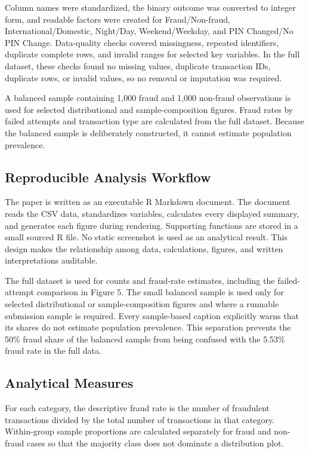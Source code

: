\documentclass[conference,final,]{IEEEtran}
\begin{document}
Column names were standardized, the binary outcome was converted to
integer form, and readable factors were created for Fraud/Non-fraud,
International/Domestic, Night/Day, Weekend/Weekday, and PIN Changed/No
PIN Change. Data-quality checks covered missingness, repeated
identifiers, duplicate complete rows, and invalid ranges for selected
key variables. In the full dataset, these checks found no missing
values, duplicate transaction IDs, duplicate rows, or invalid values, so
no removal or imputation was required.

A balanced sample containing 1,000 fraud and 1,000 non-fraud
observations is used for selected distributional and sample-composition
figures. Fraud rates by failed attempts and transaction type are
calculated from the full dataset. Because the balanced sample is
deliberately constructed, it cannot estimate population prevalence.

\subsection{Reproducible Analysis
Workflow}\label{reproducible-analysis-workflow}

The paper is written as an executable R Markdown document. The document
reads the CSV data, standardizes variables, calculates every displayed
summary, and generates each figure during rendering. Supporting
functions are stored in a small sourced R file. No static screenshot is
used as an analytical result. This design makes the relationship among
data, calculations, figures, and written interpretations auditable.

The full dataset is used for counts and fraud-rate estimates, including
the failed-attempt comparison in Figure 5. The small balanced sample is
used only for selected distributional or sample-composition figures and
where a runnable submission sample is required. Every sample-based
caption explicitly warns that its shares do not estimate population
prevalence. This separation prevents the 50\% fraud share of the
balanced sample from being confused with the 5.53\% fraud rate in the
full data.

\subsection{Analytical Measures}\label{analytical-measures}

For each category, the descriptive fraud rate is the number of
fraudulent transactions divided by the total number of transactions in
that category. Within-group sample proportions are calculated separately
for fraud and non-fraud cases so that the majority class does not
dominate a distribution plot.
\end{document}
